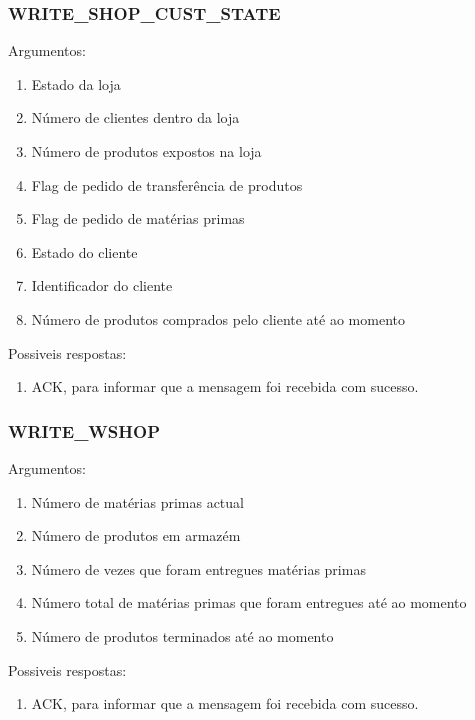 \documentclass[11pt,a4paper]{report}
\begin{document}
\subsubsection{WRITE\_SHOP\_CUST\_STATE}
Argumentos:
\begin{enumerate}
    \itemsep-0.4em
    \item Estado da loja
    \item Número de clientes dentro da loja
    \item Número de produtos expostos na loja
    \item Flag de pedido de transferência de produtos
    \item Flag de pedido de matérias primas
    \item Estado do cliente
    \item Identificador do cliente
    \item Número de produtos comprados pelo cliente até ao momento
\end{enumerate}
Possiveis respostas:
\begin{enumerate}
    \itemsep-0.4em
    \item ACK, para informar que a mensagem foi recebida com sucesso.
\end{enumerate}

\subsubsection{WRITE\_WSHOP}
Argumentos:
\begin{enumerate}
    \itemsep-0.4em
    \item Número de matérias primas actual
    \item Número de produtos em armazém
    \item Número de vezes que foram entregues matérias primas
    \item Número total de matérias primas que foram entregues até ao momento
    \item Número de produtos terminados até ao momento
\end{enumerate}
Possiveis respostas:
\begin{enumerate}
    \itemsep-0.4em
    \item ACK, para informar que a mensagem foi recebida com sucesso.
\end{enumerate}
\end{document}
